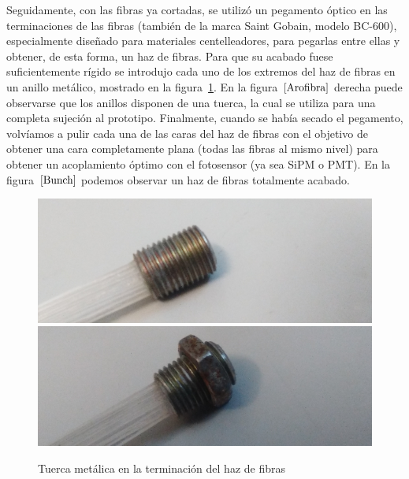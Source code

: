 Seguidamente, con las fibras ya cortadas, se utilizó un pegamento óptico en las terminaciones de las fibras (también de  la marca Saint Gobain, modelo BC-600), especialmente diseñado para materiales centelleadores, para pegarlas entre ellas y obtener, de esta forma, un haz de fibras. Para que su acabado fuese suficientemente rígido se introdujo cada uno de los extremos del haz de fibras en un anillo metálico, mostrado en la figura~\ref{Arofibra}. En la figura~$\ref{Arofibra}$ derecha puede observarse que los anillos disponen  de una tuerca, la cual se utiliza para una completa sujeción al prototipo.
Finalmente, cuando se había secado el pegamento, volvíamos a pulir cada una de las caras del haz de fibras con el objetivo de obtener una cara completamente plana (todas las fibras al mismo nivel) para obtener un  acoplamiento óptimo con el fotosensor (ya sea SiPM o PMT). En la figura~$\ref{Bunch}$ podemos observar un  haz de fibras totalmente acabado.


\begin{figure}[htb]
\centering
{
\includegraphics[scale=0.4]{arometalico.png} 
}
{
\includegraphics[scale=0.4]{arometalicoconrosca.png} 
}
\caption{Tuerca metálica en la terminación del haz de fibras\label{Arofibra}}
\end{figure} 




